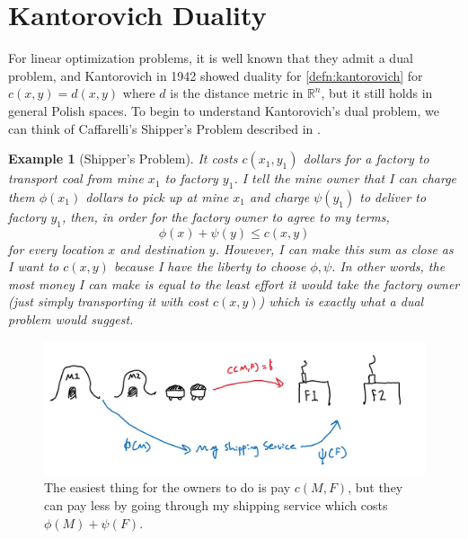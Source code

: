 \documentclass[12pt]{article}
\newcommand{\R}{\mathbb{R}}
\theoremstyle{plain}
\newtheorem{exmp}{Example}[section]
\numberwithin{equation}{section}
\begin{document}
\section{Kantorovich Duality}
For linear optimization problems, it is well known that they admit a dual problem, and Kantorovich in 1942 showed duality for \autoref{defn:kantorovich} for $c(x,y) = d(x,y)$ where $d$ is the distance metric in $\R^n$, but it still holds in general Polish spaces. 
To begin to understand Kantorovich's dual problem, we can think of Caffarelli's Shipper's Problem described in \cite{villani}.
\begin{exmp}[Shipper's Problem]\label{exmp:ship}
  It costs $c(x_1,y_1)$ dollars for a factory to transport coal from mine $x_1$ to factory $y_1$. I tell the mine owner that I can charge them $\phi(x_1)$ dollars to pick up at mine $x_1$ and charge $\psi(y_1)$ to deliver to factory $y_1$, then, in order for the factory owner to agree to my terms, 
  \[\phi(x)+\psi(y)\le c(x,y)\]
  for every location $x$ and destination $y$. However, I can make this sum as close as I want to $c(x,y)$ because I have the liberty to choose $\phi,\psi$. In other words, the most money I can make is equal to the least effort it would take the factory owner (just simply transporting it with cost $c(x,y)$) which is exactly what a dual problem would suggest.
\end{exmp}
\begin{figure}[H]
  \center
  \includegraphics[scale=0.3]{Shippers.jpg}
  \caption{The easiest thing for the owners to do is pay $c(M,F)$, but they can pay less by going through my shipping service which costs $\phi(M) + \psi(F)$.}
\end{figure}
\end{document}
